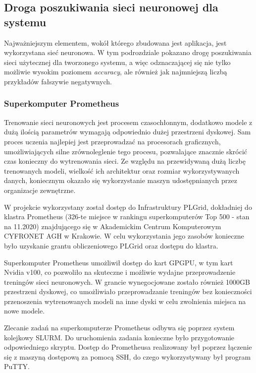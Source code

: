 \documentclass[polish,12pt]{aghthesis}
\begin{document}
\subsection{Droga poszukiwania sieci neuronowej dla systemu}

\par Najważniejszym elementem, wokół którego zbudowana jest aplikacja, jest wykorzystana sieć neuronowa. W tym podrozdziale pokazano drogę poszukiwania sieci użytecznej dla tworzonego systemu, a więc odznaczającej się nie tylko możliwie wysokim poziomem \textit{accuracy}, ale również jak najmniejszą liczbą przykładów fałszywie negatywnych.

\subsubsection{Superkomputer Prometheus}
\par Trenowanie sieci neuronowych jest procesem czasochłonnym, dodatkowo modele z dużą ilością parametrów wymagają odpowiednio dużej przestrzeni dyskowej. Sam proces uczenia najlepiej jest przeprowadzać na procesorach graficznych, umożliwiających silne zrównoleglenie tego procesu, pozwalające znacznie skrócić czas konieczny do wytrenowania sieci. Ze względu na przewidywaną dużą liczbę trenowanych modeli, wielkość ich architektur oraz rozmiar wykorzystywanych danych, koniecznym okazało się wykorzystanie maszyn udostępnianych przez organizacje zewnętrzne.
\par W projekcie wykorzystany został dostęp do Infrastruktury PLGrid, dokładniej do klastra Prometheus (326-te miejsce w rankingu superkomputerów Top 500 - stan na 11.2020) znajdującego się w Akademickim Centrum Komputerowym CYFRONET AGH w Krakowie. W celu wykorzystania jego zasobów konieczne było uzyskanie grantu obliczeniowego PLGrid oraz dostępu do klastra. 
\par Superkomputer Prometheus umożliwił dostęp do kart GPGPU, w tym kart Nvidia v100, co pozwoliło na skuteczne i możliwie wydajne przeprowadzenie treningów sieci neuronowych. W grancie wynegocjowane zostało również 1000GB przestrzeni dyskowej, co umożliwiało przeprowadzanie treningów bez konieczności przenoszenia wytrenowanych modeli na inne dyski w celu zwolnienia miejsca na nowe modele.
\par Zlecanie zadań na superkomputerze Prometheus odbywa się poprzez system kolejkowy SLURM. Do uruchomienia zadania konieczne było przygotowanie odpowiedniego skryptu. Dostęp do Prometheusa realizowany był poprzez łączenie się z maszyną dostępową za pomocą SSH, do czego wykorzystywany był program PuTTY.
\end{document}

